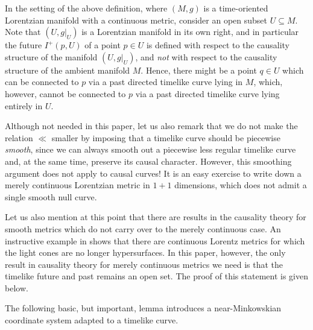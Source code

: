 \documentclass[reqno]{article}
\begin{document}
\begin{remark}\label{schwrem:setting_above_definition_time_oriented}
In the setting of the above definition, where $(M,g)$ is a time-oriented Lorentzian manifold with a continuous metric, consider an open subset $U \subseteq M$. Note that $(U,g|_U)$ is a Lorentzian manifold in its own right, and in particular the future $I^+(p,U)$ of a point $p \in U$ is defined with respect to the causality structure of the manifold $(U,g|_U)$, and \emph{not} with respect to the causality structure of the ambient manifold $M$. Hence, there might be a point $q \in U$ which can be connected to $p$ via a past directed timelike curve lying in $M$, which, however, cannot be connected to $p$ via a past directed timelike curve lying entirely in $U$.
\end{remark}

Although not needed in this paper, let us also remark that we do not make the relation $\ll$ smaller by imposing that a timelike curve should be piecewise \emph{smooth}, since we can always smooth out a piecewise less regular timelike curve and, at the same time, preserve its causal character. However, this smoothing argument does not apply to causal curves! It is an easy exercise to write down a merely continuous Lorentzian metric in $1+1$ dimensions, which does not admit a single smooth null curve. 

Let us also mention at this point that there are results in the causality theory for smooth metrics which do not carry over to the merely continuous case. An instructive example in \cite{ChrusGra12} shows that there are continuous Lorentz metrics for which the light cones are no longer hypersurfaces. In this paper, however, the only result in causality theory for merely continuous metrics we need is that the timelike future and past remains an open set. The proof of this statement is given below.

The following basic, but important, lemma introduces a near-Minkowskian coordinate system adapted to a timelike curve.
\end{document}
